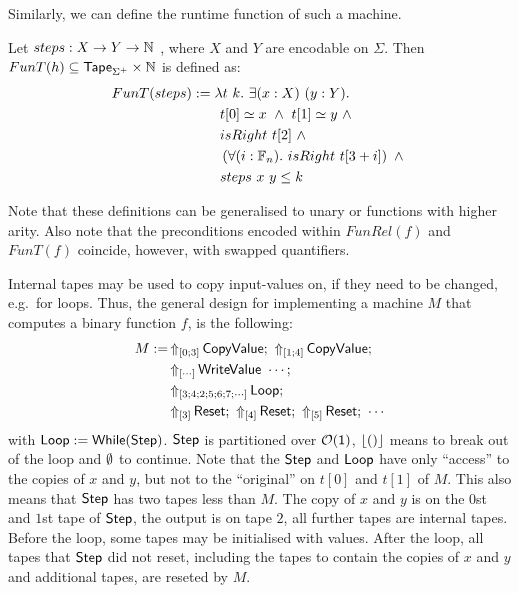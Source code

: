 Similarly, we can define the runtime function of such a machine.
\begin{definition}
  \label{def:Computes2_T}
  Let $steps : X \rightarrow Y \rightarrow \mathbb{N}$ , where $X$ and $Y$ are encodable on $\Sigma$.  Then $FunT(h) \subseteq \mathsf{Tape}_{\Sigma^+} \times \mathbb{N}$ is defined as:
  \begin{alignat*}{2}
     FunT(steps) &:= \lambda t~k.~\exists (x:X)~(y:Y). \\
    &\qquad t[0] \simeq x ~\land~ t[1] \simeq y ~\land~ \\
    &\qquad isRight~t[2] ~\land~ \\
    &\qquad \left(\forall (i:\mathbb{F}_n).~isRight~t[3+i] \right) ~\land~ \\
    &\qquad steps~x~y \leq k
  \end{alignat*}
\end{definition}

Note that these definitions can be generalised to unary or functions with higher arity.  Also note that the preconditions encoded within $FunRel(f)$
and $FunT(f)$ coincide, however, with swapped quantifiers.

Internal tapes may be used to copy input-values on, if they need to be changed, e.g.\ for loops.  Thus, the general design for implementing a machine
$M$ that computes a binary function $f$, is the following:
\begin{align*}
  M := & \LiftTapes{\MS{CopyValue}}{\Vector{0; 3}} \Seq \LiftTapes{\MS{CopyValue}}{\Vector{1; 4}} \Seq \\
       & \LiftTapes{\MS{WriteValue}~\cdots}{\Vector{\cdots}} \Seq \\
       & \LiftTapes{\MS{Loop}}{\Vector{3; 4; 2; 5; 6; 7; \cdots}} \Seq \\
       & \LiftTapes{\MS{Reset}}{\Vector{3}} \Seq \LiftTapes{\MS{Reset}}{\Vector{4}} \Seq \LiftTapes{\MS{Reset}}{\Vector{5}} \Seq \cdots
\end{align*}
with $\mathsf{Loop} := \mathsf{While}(\mathsf{Step})$.  $\mathsf{Step}$ is partitioned over $\mathcal{O}(\mathsf{1})$, $\left\lfloor {\ensuremath{\mathsf{()}}} \right\rfloor$ means to break out of the loop and $\emptyset$ to
continue.  Note that the $\mathsf{Step}$ and $\mathsf{Loop}$ have only ``access'' to the copies of $x$ and $y$, but not to the ``original'' on $t[0]$ and
$t[1]$ of $M$.  This also means that $\mathsf{Step}$ has two tapes less than $M$.  The copy of $x$ and $y$ is on the $0$st and $1$st tape of $\mathsf{Step}$,
the output is on tape $2$, all further tapes are internal tapes.  Before the loop, some tapes may be initialised with values.  After the loop, all
tapes that $\mathsf{Step}$ did not reset, including the tapes to contain the copies of $x$ and $y$ and additional tapes, are reseted by $M$.

